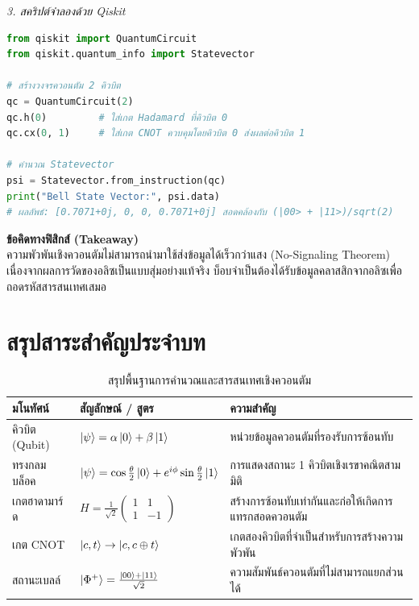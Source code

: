 \begin{psctexample}
\textit{3. สคริปต์จำลองด้วย Qiskit}
\begin{lstlisting}[language=Python, caption={การสร้างสถานะเบลล์ด้วย Qiskit}, label={lst:qiskit_bell}]
from qiskit import QuantumCircuit
from qiskit.quantum_info import Statevector

# สร้างวงจรควอนตัม 2 คิวบิต
qc = QuantumCircuit(2)
qc.h(0)         # ใส่เกต Hadamard ที่คิวบิต 0
qc.cx(0, 1)     # ใส่เกต CNOT ควบคุมโดยคิวบิต 0 ส่งผลต่อคิวบิต 1

# คำนวณ Statevector
psi = Statevector.from_instruction(qc)
print("Bell State Vector:", psi.data)
# ผลลัพธ์: [0.7071+0j, 0, 0, 0.7071+0j] สอดคล้องกับ (|00> + |11>)/sqrt(2)
\end{lstlisting}

\textbf{ข้อคิดทางฟิสิกส์ (Takeaway)} \\
ความพัวพันเชิงควอนตัมไม่สามารถนำมาใช้ส่งข้อมูลได้เร็วกว่าแสง (No-Signaling Theorem) เนื่องจากผลการวัดของอลิซเป็นแบบสุ่มอย่างแท้จริง บ็อบจำเป็นต้องได้รับข้อมูลคลาสสิกจากอลิซเพื่อถอดรหัสสารสนเทศเสมอ
\qedexam
\end{psctexample}

\section{สรุปสาระสำคัญประจำบท}

\begin{table}[H]
\centering
\caption{สรุปพื้นฐานการคำนวณและสารสนเทศเชิงควอนตัม}
\label{tab:quantum_computing_summary}
\small
\begin{tabularx}{\textwidth}{l >{\centering\arraybackslash}p{4.2cm} Y}
\toprule
\textbf{มโนทัศน์} & \textbf{สัญลักษณ์ / สูตร} & \textbf{ความสำคัญ} \\
\midrule
คิวบิต (Qubit) & $\ket{\psi} = \alpha\ket{0} + \beta\ket{1}$ & หน่วยข้อมูลควอนตัมที่รองรับการซ้อนทับ \\
ทรงกลมบล็อค & $\ket{\psi} = \cos\frac{\theta}{2}\ket{0} + e^{i\phi}\sin\frac{\theta}{2}\ket{1}$ & การแสดงสถานะ 1 คิวบิตเชิงเรขาคณิตสามมิติ \\
เกตฮาดามาร์ด & $H = \frac{1}{\sqrt{2}}\begin{pmatrix}1&1\\1&-1\end{pmatrix}$ & สร้างการซ้อนทับเท่ากันและก่อให้เกิดการแทรกสอดควอนตัม \\
เกต CNOT & $\ket{c, t} \to \ket{c, c \oplus t}$ & เกตสองคิวบิตที่จำเป็นสำหรับการสร้างความพัวพัน \\
สถานะเบลล์ & $\ket{\Phi^+} = \frac{\ket{00} + \ket{11}}{\sqrt{2}}$ & ความสัมพันธ์ควอนตัมที่ไม่สามารถแยกส่วนได้ \\
\bottomrule
\end{tabularx}
\end{table}

